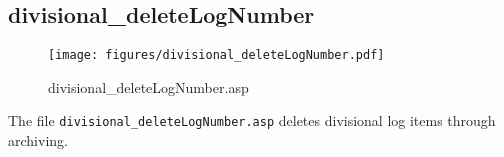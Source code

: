 \subsection{divisional\_deleteLogNumber}
\begin{figure}[htb]
    \begin{center}
        \texttt{[image: figures/divisional\_deleteLogNumber.pdf]}
    \end{center}
    \caption{divisional\_deleteLogNumber.asp}
    \label{fig:divisional_deleteLogNumber}
\end{figure}

The file \verb|divisional_deleteLogNumber.asp| deletes divisional log items
through archiving.
